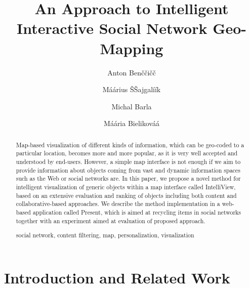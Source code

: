 \documentclass{llncs}
\begin{document}
 
%

\title{An Approach to Intelligent Interactive Social Network Geo-Mapping}
%
\titlerunning{}  %
%
\author{Anton Ben\v{c}či\v{c}č \and M\'{a}árius \v{S}Šajgal\'{i}ík \and Michal Barla \and M\'{a}ária Bielikov\'{a}á }
%
\authorrunning{} %
%

\maketitle            

\begin{abstract}
Map-based visualization of different kinds of information, which can be geo-coded to a particular location, becomes more and more popular, as it is very well accepted and understood by end-users. However, a simple map interface is not enough if we aim to provide information about objects coming from vast and dynamic information spaces such as the Web or social networks are. In this paper, we propose a novel method for intelligent visualization of generic objects within a map interface called IntelliView, based on an extensive evaluation and ranking of objects including both content and collaborative-based approaches. We describe the method implementation in a web-based application called Present, which is aimed at recycling items in social networks together with an experiment aimed at evaluation of proposed approach.

\begin{keywords}
social network, content filtering, map, personalization, visualization
\end{keywords}

\end{abstract}


\section{Introduction and Related Work}
\end{document}
